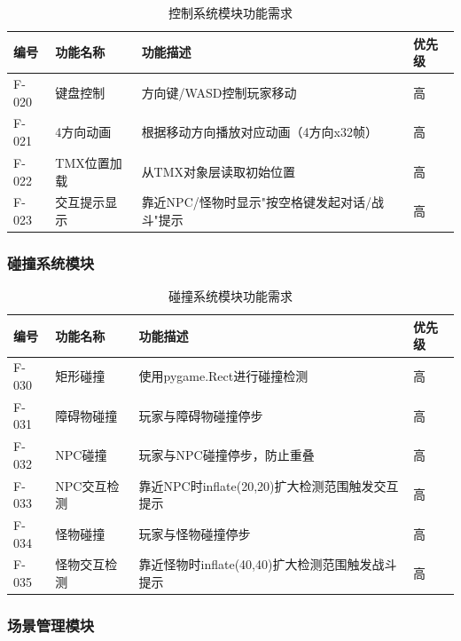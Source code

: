 \documentclass[12pt,a4paper]{article}
\begin{document}
\begin{table}[H]
\centering
\caption{控制系统模块功能需求}
\renewcommand{\arraystretch}{1.3}
\begin{tabularx}{\textwidth}{>{\centering\arraybackslash}m{2cm}>{\centering\arraybackslash}m{3cm}>{\centering\arraybackslash}m{5cm}>{\centering\arraybackslash}m{2cm}}
\toprule
\textbf{编号} & \textbf{功能名称} & \textbf{功能描述} & \textbf{优先级} \\
\midrule
F-020 & 键盘控制 & 方向键/WASD控制玩家移动 & 高 \\
F-021 & 4方向动画 & 根据移动方向播放对应动画（4方向x32帧） & 高 \\
F-022 & TMX位置加载 & 从TMX对象层读取初始位置 & 高 \\
F-023 & 交互提示显示 & 靠近NPC/怪物时显示"按空格键发起对话/战斗"提示 & 高 \\
\bottomrule
\end{tabularx}
\end{table}

\subsubsection{碰撞系统模块}

\begin{table}[H]
\centering
\caption{碰撞系统模块功能需求}
\renewcommand{\arraystretch}{1.3}
\begin{tabularx}{\textwidth}{>{\centering\arraybackslash}m{2cm}>{\centering\arraybackslash}m{3cm}>{\centering\arraybackslash}m{5cm}>{\centering\arraybackslash}m{2cm}}
\toprule
\textbf{编号} & \textbf{功能名称} & \textbf{功能描述} & \textbf{优先级} \\
\midrule
F-030 & 矩形碰撞 & 使用pygame.Rect进行碰撞检测 & 高 \\
F-031 & 障碍物碰撞 & 玩家与障碍物碰撞停步 & 高 \\
F-032 & NPC碰撞 & 玩家与NPC碰撞停步，防止重叠 & 高 \\
F-033 & NPC交互检测 & 靠近NPC时inflate(20,20)扩大检测范围触发交互提示 & 高 \\
F-034 & 怪物碰撞 & 玩家与怪物碰撞停步 & 高 \\
F-035 & 怪物交互检测 & 靠近怪物时inflate(40,40)扩大检测范围触发战斗提示 & 高 \\
\bottomrule
\end{tabularx}
\end{table}

\subsubsection{场景管理模块}
\end{document}
